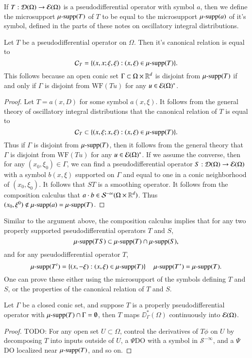 If $T: \operatorname{\mathcal{D}}(\Omega) \to \operatorname{\mathcal{E}}(\Omega)$ is a pseudodifferential operator with symbol $a$, then we define the microsupport $\operatorname{\text{$\mu$-supp}}(T)$ of $T$ to be equal to the microsupport $\operatorname{\text{$\mu$-supp}}(a)$ of it's symbol, defined in the parts of these notes on oscillatory integral distributions.

\begin{lemma}
    Let $T$ be a pseudodifferential operator on $\Omega$. Then it's canonical relation is equal to
    \[ \mathcal{C}_T = \{ (x,x;\xi,\xi): (x,\xi) \in \operatorname{\text{$\mu$-supp}}(T) \}. \]
    This follows because an open conic set $\Gamma \subset \Omega \times \operatorname{\mathbb{R}}^d$ is disjoint from $\operatorname{\text{$\mu$-supp}}(T)$ if and only if $\Gamma$ is disjoint from $\text{WF}(Tu)$ for any $u \in \operatorname{\mathcal{E}}(\Omega)^*$.
\end{lemma}
\begin{proof}
    Let $T = a(x,D)$ for some symbol $a(x,\xi)$. It follows from the general theory of oscillatory integral distributions that the canonical relation of $T$ is equal to
    \[ \mathcal{C}_T \subset \{ (x,\xi;x,\xi): (x,\xi) \in \operatorname{\text{$\mu$-supp}}(T) \}. \]
    Thus if $\Gamma$ is disjoint from $\operatorname{\text{$\mu$-supp}}(T)$, then it follows from the general theory that $\Gamma$ is disjoint from $\text{WF}(Tu)$ for any $u \in \operatorname{\mathcal{E}}(\Omega)^*$. If we assume the converse, then for any $(x_0,\xi_0) \in \Gamma$, we can find a pseudodifferential operator $S: \operatorname{\mathcal{D}}(\Omega) \to \operatorname{\mathcal{E}}(\Omega)$ with a symbol $b(x,\xi)$ supported on $\Gamma$ and equal to one in a conic neighborhood of $(x_0,\xi_0)$. It follows that $ST$ is a smoothing operator. It follows from the composition calculus that $a \cdot b \in \mathcal{S}^{-\infty}(\Omega \times \operatorname{\mathbb{R}}^d)$. Thus $(x_0,\xi^0) \not \in \operatorname{\text{$\mu$-supp}}(a) = \operatorname{\text{$\mu$-supp}}(T)$.
\end{proof}

Similar to the argument above, the composition calculus implies that for any two properly supported pseudodifferential operators $T$ and $S$,
%
\[ \operatorname{\text{$\mu$-supp}}(TS) \subset \operatorname{\text{$\mu$-supp}}(T) \cap \operatorname{\text{$\mu$-supp}}(S), \]
%
and for any pseudodifferential operator $T$,
%
\[ \operatorname{\text{$\mu$-supp}}(T^t) = \{ (x,-\xi): (x,\xi) \in \operatorname{\text{$\mu$-supp}}(T) \} \quad \operatorname{\text{$\mu$-supp}}(T^*) = \operatorname{\text{$\mu$-supp}}(T). \]
%
One can prove these either using the microsupport of the symbols defining $T$ and $S$, or the properties of the canonical relation of $T$ and $S$.

\begin{theorem}
    Let $\Gamma$ be a closed conic set, and suppose $T$ is a properly pseudodifferential operator with $\operatorname{\text{$\mu$-supp}}(T) \cap \Gamma = \emptyset$, then $T$ maps $\DD^*_\Gamma(\Omega)$ continuously into $\operatorname{\mathcal{E}}(\Omega)$.
\end{theorem}
\begin{proof}
    TODO: For any open set $U \subset \Omega$, control the derivatives of $T \phi$ on $U$ by decomposing $T$ into inputs outside of $U$, a $\Psi$DO with a symbol in $\mathcal{S}^{-\infty}$, and a $\Psi$DO localized near $\operatorname{\text{$\mu$-supp}}(T)$, and so on.
\end{proof}

